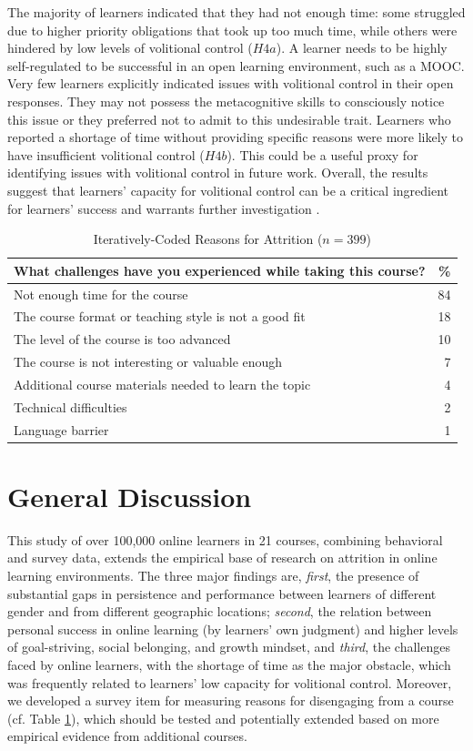\documentclass{sigchi}\usepackage[]{graphicx}\usepackage[]{color}
\begin{document}
The majority of learners indicated that they had not enough time: some struggled due to higher priority obligations that took up too much time, while others were hindered by low levels of volitional control ($H4a$). A learner needs to be highly self-regulated to be successful in an open learning environment, such as a MOOC. Very few learners explicitly indicated issues with volitional control in their open responses. They may not possess the metacognitive skills to consciously notice this issue or they preferred not to admit to this undesirable trait. Learners who reported a shortage of time without providing specific reasons were more likely to have insufficient volitional control ($H4b$). This could be a useful proxy for identifying issues with volitional control in future work. Overall, the results suggest that learners' capacity for volitional control can be a critical ingredient for learners' success and warrants further investigation \cite{corno2001volitional}.

\begin{table}[h!]
\caption{Iteratively-Coded Reasons for Attrition ($n=399$)}
\label{tab:s2reas}
\small
\center
\begin{tabular}{lr}
\toprule
What challenges have you experienced while taking this course?  & \% \\
\midrule
Not enough time for the course & 84 \\
The course format or teaching style is not a good fit & 18 \\
The level of the course is too advanced & 10 \\
The course is not interesting or valuable enough & 7 \\
Additional course materials needed to learn the topic & 4 \\
Technical difficulties & 2 \\
Language barrier & 1 \\
\bottomrule
\end{tabular}
\end{table}


\section{General Discussion}

This study of over 100,000 online learners in 21 courses, combining behavioral and survey data, extends the empirical base of research on attrition in online learning environments. The three major findings are, \emph{first}, the presence of substantial gaps in persistence and performance between learners of different gender and from different geographic locations; \emph{second}, the relation between personal success in online learning (by learners' own judgment) and higher levels of goal-striving, social belonging, and growth mindset, and \emph{third}, the challenges faced by online learners, with the shortage of time as the major obstacle, which was frequently related to learners' low capacity for volitional control. Moreover, we developed a survey item for measuring reasons for disengaging from a course (cf. Table \ref{tab:s2reas}), which should be tested and potentially extended based on more empirical evidence from additional courses.
\end{document}
